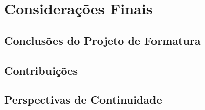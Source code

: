 \documentclass[twosideprint]{politex}
\begin{document}
\chapter{Considerações Finais}
	\section{Conclusões do Projeto de Formatura}
	\section{Contribuições}
	\section{Perspectivas de Continuidade}
	





%








\end{document}
